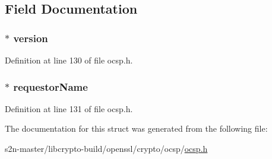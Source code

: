 \subsection{Field Documentation}
\subsubsection[{\texorpdfstring{version}{version}}]{ $\ast$ version}\hypertarget{structocsp__req__info__st_abf367aeef355b6acf5be7c569c4b28b0}{}\label{structocsp__req__info__st_abf367aeef355b6acf5be7c569c4b28b0}


Definition at line 130 of file ocsp.\+h.

\subsubsection[{\texorpdfstring{requestor\+Name}{requestorName}}]{ $\ast$ requestor\+Name}\hypertarget{structocsp__req__info__st_ac57f4798cb28915693b3453d7e670d68}{}\label{structocsp__req__info__st_ac57f4798cb28915693b3453d7e670d68}


Definition at line 131 of file ocsp.\+h.



The documentation for this struct was generated from the following file\+:\begin{DoxyCompactItemize}
\item 
s2n-\/master/libcrypto-\/build/openssl/crypto/ocsp/\hyperlink{crypto_2ocsp_2ocsp_8h}{ocsp.\+h}\end{DoxyCompactItemize}
